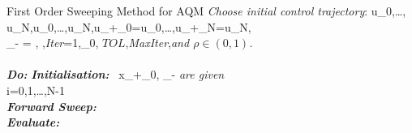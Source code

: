 \documentclass[12pt]{article}
\begin{document}
\begin{pseudocode}[ruled]{ }{First \hspace{1mm} Order \hspace{1mm} Sweeping \hspace{1mm}Method \hspace{1mm} for \hspace{1mm} AQM\hspace{1mm}  }
 \textit{Choose initial control trajectory}:\hspace{1mm} u_{0},\dots, u_{N},\delta u_{0},\dots,\delta u_{N},{u_{+}}_{0}=u_{0},\dots,{u_{+}}_{N}=u_{N},   \\ 
  _{-} = \infty, \gamma,\hspace{1mm}\textit{Iter}=1,\bigtriangleup_{0},\hspace{1mm} $TOL$,\hspace{2mm}\textit{MaxIter},\hspace{1mm}\textit{and  $\rho \in (0,1)$.}\\\\
\textit{\bf Do:}
 \BEGIN
  \textit{\bf{Initialisation:}}  \hspace{5mm}  \ {x_{+}}_{0}, _{-} \hspace{2mm}\textit{are given}\\
\FOR i=0,1,\dots,N-1\\
  \hspace{1mm}\textit{\bf{Forward Sweep:}} \\ 
	\hspace{5mm} \textit{\bf{Evaluate:}} \\


\end{pseudocode}
\end{document}

